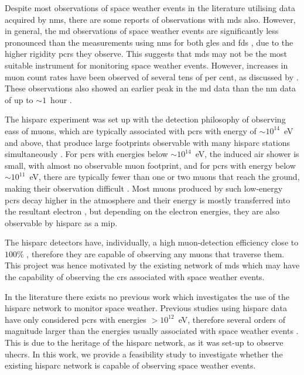 Despite most observations of space weather events in the literature utilising data acquired by \glspl{nm}, there are some reports of observations with \glspl{md} also. However, in general, the \gls{md} observations of space weather events are significantly less pronounced than the measurements using \glspl{nm} for both \glspl{gle} \citep{timashkov_ground_2008, augusto_signals_2016} and \glspl{fd} \citep{braun_forbush_2009, rockenbach_global_2014}, due to the higher rigidity \glspl{pcr} they observe. This suggests that \glspl{md} may not be the most suitable instrument for monitoring space weather events. However, increases in muon count rates have been observed of several tens of per cent, as discussed by \citet{shea_solar_1990, lovell_extended_1998, moraal_cosmic-ray_2014}. These observations also showed an earlier peak in the \gls{md} data than the \gls{nm} data of up to $\sim1$~hour \citep{lovell_extended_1998, moraal_cosmic-ray_2014}.

The \gls{hisparc} experiment was set up with the detection philosophy of observing \glspl{eas} of muons, which are typically associated with \glspl{pcr} with energy of $\sim10^{14}$~eV and above, that produce large footprints observable with many \gls{hisparc} stations simultaneously \citep{fokkema_hisparc_2012, bartels_hisparc_2012, van_dam_hisparc_2020}. For \glspl{pcr} with energies below $\sim10^{14}$~eV, the induced air shower is small, with almost no observable muon footprint, and for \glspl{pcr} with energy below $\sim10^{11}$~eV, there are typically fewer than one or two muons that reach the ground, making their observation difficult \citep{van_dam_hisparc_2020}. Most muons produced by such low-energy \glspl{pcr} decay higher in the atmosphere and their energy is mostly transferred into the resultant electron \citep{van_dam_hisparc_2020}, but depending on the electron energies, they are also observable by \gls{hisparc} as a \gls{mip}.

The \gls{hisparc} detectors have, individually, a high muon-detection
efficiency close to $100\%$ \citep{van_dam_hisparc_2020}, therefore they are capable of observing any muons that traverse them. This project was hence motivated by the existing network of \glspl{md} which may have the capability of observing the \glspl{cr} associated with space weather events.

In the literature there exists no previous work which investigates the use of the \gls{hisparc} network to monitor space weather. Previous studies using \gls{hisparc} data have only considered \glspl{pcr} with energies $> 10^{12}$~eV, therefore several orders of magnitude larger than the energies usually associated with space weather events \citep{bartels_hisparc_2012, van_dam_probing_2020}. This is due to the heritage of the \gls{hisparc} network, as it was set-up to observe \glspl{uhecr}. In this work, we provide a feasibility study to investigate whether the existing \gls{hisparc} network is capable of observing space weather events. 

